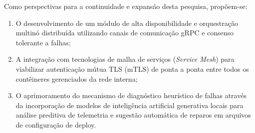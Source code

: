 Como perspectivas para a continuidade e expansão desta pesquisa, propõem-se:
\begin{enumerate}
    \item O desenvolvimento de um módulo de alta disponibilidade e orquestração multinó distribuída utilizando canais de comunicação gRPC e consenso tolerante a falhas;
    \item A integração com tecnologias de malha de serviços (\textit{Service Mesh}) para viabilizar autenticação mútua TLS (mTLS) de ponta a ponta entre todos os contêineres gerenciados da rede interna;
    \item O aprimoramento do mecanismo de diagnóstico heurístico de falhas através da incorporação de modelos de inteligência artificial generativa locais para análise preditiva de telemetria e sugestão automática de reparos em arquivos de configuração de deploy.
\end{enumerate}
